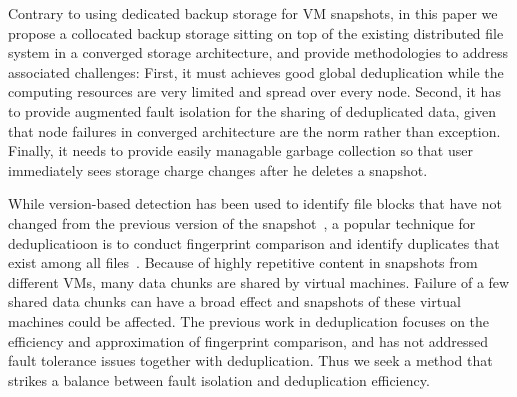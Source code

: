 Contrary to using dedicated backup storage for VM snapshots, 
in this paper we propose a collocated backup storage sitting on top of 
the existing distributed file system in a converged storage architecture,
and provide methodologies to address associated challenges: 
First, it must achieves good global deduplication 
while the computing resources are very limited and spread over every node. 
Second, it has to provide augmented fault isolation for the sharing of deduplicated data,
given that node failures in converged architecture are the norm rather than exception.
Finally, it needs to provide easily managable garbage collection so that user immediately
sees storage charge changes after he deletes a snapshot.


 

While version-based detection has been used to identify file blocks that have not 
changed from the previous version of the snapshot~\cite{Clements2009,Vrable2009,TanIPDPS2011},
a popular technique for deduplicatioon is to 
conduct fingerprint  comparison and identify duplicates that exist
among all files~\cite{Guo2011,Dong2011,extreme_binning09}. 
Because of highly repetitive content in snapshots from different VMs,
many data chunks are shared by virtual machines.  
Failure of a few shared data chunks can have a 
broad effect and snapshots of these virtual machines could be affected.
The previous work in deduplication focuses on the efficiency and approximation of
fingerprint comparison, and has not addressed fault tolerance issues  together with deduplication.
Thus we seek a method that strikes a balance between fault isolation and deduplication efficiency.

